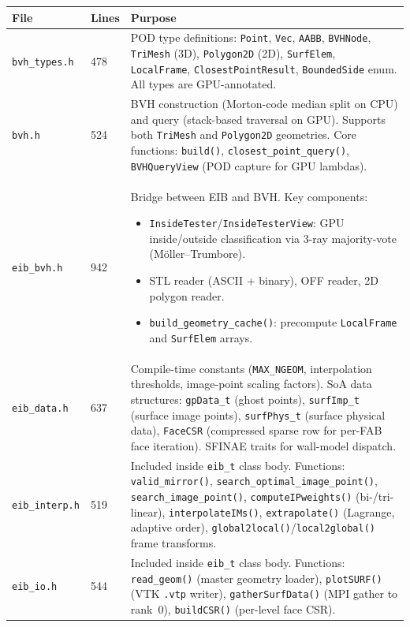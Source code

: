 \documentclass[11pt,a4paper]{article}
\begin{document}
\begin{longtable}{p{3.5cm} p{1cm} p{9cm}}
\toprule
\textbf{File} & \textbf{Lines} & \textbf{Purpose} \\
\midrule
\texttt{bvh\_types.h} & 478
  & POD type definitions: \texttt{Point}, \texttt{Vec},
    \texttt{AABB}, \texttt{BVHNode}, \texttt{TriMesh} (3D),
    \texttt{Polygon2D} (2D), \texttt{SurfElem}, \texttt{LocalFrame},
    \texttt{ClosestPointResult}, \texttt{BoundedSide} enum.
    All types are GPU-annotated. \\

\texttt{bvh.h} & 524
  & BVH construction (Morton-code median split on CPU) and query
    (stack-based traversal on GPU).  Supports both \texttt{TriMesh}
    and \texttt{Polygon2D} geometries.  Core functions:
    \texttt{build()}, \texttt{closest\_point\_query()},
    \texttt{BVHQueryView} (POD capture for GPU lambdas). \\

\texttt{eib\_bvh.h} & 942
  & Bridge between EIB and BVH.  Key components:
    \begin{itemize}
      \item \texttt{InsideTester}/\texttt{InsideTesterView}: GPU inside/outside
            classification via 3-ray majority-vote (M\"oller--Trumbore).
      \item STL reader (ASCII + binary), OFF reader, 2D polygon reader.
      \item \texttt{build\_geometry\_cache()}: precompute \texttt{LocalFrame}
            and \texttt{SurfElem} arrays.
    \end{itemize} \\

\texttt{eib\_data.h} & 637
  & Compile-time constants (\texttt{MAX\_NGEOM}, interpolation thresholds,
    image-point scaling factors).
    SoA data structures:
    \texttt{gpData\_t} (ghost points),
    \texttt{surfImp\_t} (surface image points),
    \texttt{surfPhys\_t} (surface physical data),
    \texttt{FaceCSR} (compressed sparse row for per-FAB face iteration).
    SFINAE traits for wall-model dispatch. \\

\texttt{eib\_interp.h} & 519
  & Included inside \texttt{eib\_t} class body.  Functions:
    \texttt{valid\_mirror()},
    \texttt{search\_optimal\_image\_point()},
    \texttt{search\_image\_point()},
    \texttt{computeIPweights()} (bi-/tri-linear),
    \texttt{interpolateIMs()},
    \texttt{extrapolate()} (Lagrange, adaptive order),
    \texttt{global2local()}/\texttt{local2global()} frame transforms. \\

\texttt{eib\_io.h} & 544
  & Included inside \texttt{eib\_t} class body.  Functions:
    \texttt{read\_geom()} (master geometry loader),
    \texttt{plotSURF()} (VTK \texttt{.vtp} writer),
    \texttt{gatherSurfData()} (MPI gather to rank~0),
    \texttt{buildCSR()} (per-level face CSR). \\

\bottomrule
\end{longtable}
\end{document}
